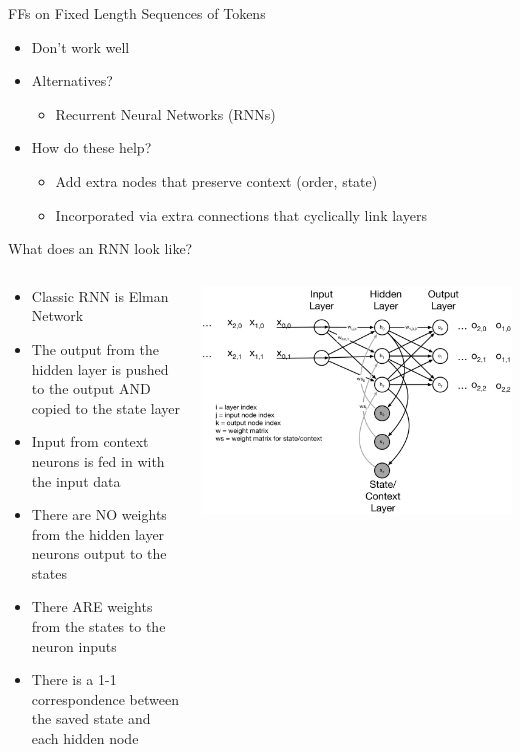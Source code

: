 \documentclass[aspectratio=169]{beamer}
\begin{document}
\begin{frame}{FFs on Fixed Length Sequences of Tokens}

\begin{itemize}
	\item Don't work well
	\item Alternatives?
	\begin{itemize}
	\item Recurrent Neural Networks (RNNs)
	\end{itemize}
	\item How do these help?
	\begin{itemize}
	\item Add extra nodes that preserve context (order, state)
	\item Incorporated via extra connections that cyclically link layers
	\end{itemize}
\end{itemize}
\end{frame}
\begin{frame}{What does an RNN look like?}

\begin{columns}
\begin{column}{0.5\textwidth}
\begin{itemize}
	\item Classic RNN is Elman Network
	\item The output from the hidden layer is pushed to the output AND copied to the state layer
	\item Input from context neurons is fed in with the input data
	\item There are NO weights from the hidden layer neurons output to the states
	\item There ARE weights from the states  to the neuron inputs
	\item There is a 1-1 correspondence between the saved state and each hidden node
\end{itemize}
\end{column}
\begin{column}{0.5\textwidth}
\includegraphics[width=1\textwidth]{lectRNN/Elman.pdf}
\end{column}
\end{columns}
\end{frame}
\end{document}
